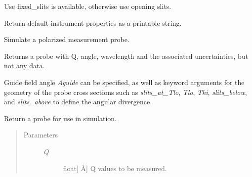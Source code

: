 \documentclass[letterpaper,10pt,english]{sphinxmanual}
\begin{document}
\begin{fulllineitems}
\begin{fulllineitems}
Use fixed\_slits is available, otherwise use opening slits.

\end{fulllineitems}


\begin{fulllineitems}
\label{api/ncnrdata:refl1d.ncnrdata.XRay.defaults}
Return default instrument properties as a printable string.

\end{fulllineitems}


\begin{fulllineitems}
\label{api/ncnrdata:refl1d.ncnrdata.XRay.load}
\end{fulllineitems}


\begin{fulllineitems}
\label{api/ncnrdata:refl1d.ncnrdata.XRay.load_magnetic}
\end{fulllineitems}


\begin{fulllineitems}
\label{api/ncnrdata:refl1d.ncnrdata.XRay.magnetic_probe}
Simulate a polarized measurement probe.

Returns a probe with Q, angle, wavelength and the associated
uncertainties, but not any data.

Guide field angle \emph{Aguide} can be specified, as well as keyword
arguments for the geometry of the probe cross sections such as
\emph{slits\_at\_Tlo}, \emph{Tlo}, \emph{Thi}, \emph{slits\_below}, and \emph{slits\_above}
to define the angular divergence.

\end{fulllineitems}


\begin{fulllineitems}
\label{api/ncnrdata:refl1d.ncnrdata.XRay.probe}
Return a probe for use in simulation.
\begin{quote}\begin{description}
\item[{Parameters }] \leavevmode\begin{description}
\item[{\emph{Q}}] \leavevmode{[}{[}float{]} \textbar{} Å{]}
Q values to be measured.


\end{description}
\end{description}
\end{quote}
\end{fulllineitems}
\end{fulllineitems}
\end{document}
